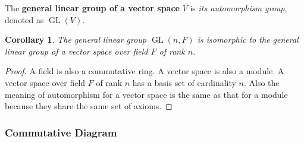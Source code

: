 \documentclass[12pt, letterpaper]{article}
\newcommand{\GL}{\operatorname{GL}}
\newtheorem{cor}[prop]{Corollary}
\theoremstyle{definition}
\theoremstyle{remark}
\theoremstyle{definition}
\theoremstyle{plain}
\numberwithin{equation}{section}
\begin{document}
	\begin{def*}
		The \textbf{general linear group of a vector space} $V$ is \textit{its automorphism group}, denoted as $\GL(V)$.
	\end{def*}
	\begin{cor}
		The general linear group $\GL(n, F)$ is isomorphic to the general linear group of a vector space over field $F$ of rank $n$.
	\end{cor}
	\begin{proof}
		A field is also a commutative ring.
		A vector space is also a module.
		A vector space over field $F$ of rank $n$ has a basis set of cardinality $n$.
		Also the meaning of automorphism for a vector space is the same as that for a module
		because they share the same set of axioms.
	\end{proof}

	\subsubsection{Commutative Diagram}
\end{document}
